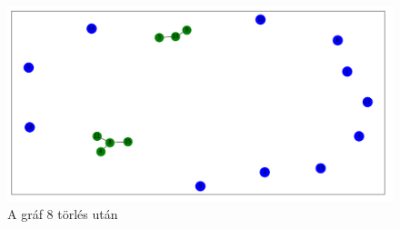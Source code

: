 \begin{figure}[h]
    \centering
    \includegraphics[scale=0.4]{images/suly9}
    \caption{A gráf 8 törlés után}
    \label{fig:enter-label}
\end{figure}



